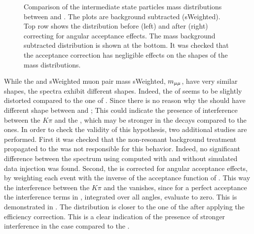 \begin{figure}[!t]
  \centering
  \begin{subfigure}{0.5\textwidth}
    \raggedright
    \scalebox{0.56}{}
    \caption{}
    \label{mkpiPlot_raw}
  \end{subfigure}%
  \hfill%
  \begin{subfigure}{0.5\textwidth}
    \raggedleft
    \scalebox{0.56}{}
    \caption{}
    \label{mkpiPlot_eff}
  \end{subfigure}
  \begin{subfigure}{0.5\textwidth}
    \raggedright
    \scalebox{0.56}{}
    \caption{}
    \label{jpsiPlot}
  \end{subfigure}
\caption{Comparison of the intermediate state particles mass distributions between \Bs and \Bd.
         The plots are background subtracted (sWeighted). Top row shows the \mkpi distribution before (left)
         and after (right) correcting for angular acceptance effects. The \jpsi mass background subtracted
         distribution is shown at the bottom. It was checked that the acceptance correction has negligible
         effects on the shapes of the \jpsi mass distributions.}
\end{figure}

While the \Bs and \Bd sWeighted muon pair mass sWeighted, $m_{\mu\mu}$, have very similar shapes, the \mkpi spectra exhibit different shapes.
Indeed, the \Bs \mkpi \sPlot of  seems to be slightly distorted compared to the one of \Bd \mkpi.
Since there is no \aprior reason why the \Kstarz \pwave
should have different shape between \BsJpsiKst and \BdJpsiKst; This could indicate the presence of interference between
the $K\pi$ \swave and the \Kstarz, which may be stronger in the \Bs decays compared to the \Bd ones. In order
to check the validity of this hypothesis, two additional studies are performed. First it was checked that the non-resonant
background treatment propagated to the \sWeights was not responsible for this behavior. Indeed, no significant difference
between the \Bs \mkpi spectrum using \sWeights computed with and without simulated data injection was found. Second, the \mkpi
is corrected for angular acceptance effects, by weighting each event with the inverse of the acceptance function of .
This way the interference between the $K\pi$ \swave and the \Kstarz \pwave vanishes, since
for a perfect acceptance the interference terms in , integrated over all angles, evaluate to zero.
This is demonstrated in . The \Bs \mkpi distribution is closer to the one of the \Bd after applying
the efficiency correction. This is a clear indication of the presence of stronger interference in the \Bs case compared to the \Bd.

